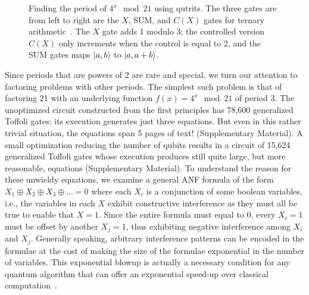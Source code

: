\documentclass{article}
\begin{document}
\begin{refsection}
\begin{wrapfigure}{r}{7cm}
  \centering
\caption{\label{fig:shor21}Finding the period of $4^x \mod{21}$ using
  qutrits. The three gates are from left to right are the $X$,
  $\textrm{SUM}$, and $C(X)$ gates for ternary
  arithmetic~\cite{10.5555/3179473.3179481}. The $X$ gate adds 1
  modulo 3; the controlled version $C(X)$ only increments when the
  control is equal to 2, and the \textrm{SUM} gates maps $\ket{a,b}$
  to $\ket{a,a+b}$.}
\end{wrapfigure}
Since periods that are powers of 2 are rare and special, we turn our
attention to factoring problems with other periods. The simplest such
problem is that of factoring 21 with an underlying function $f(x) =
4^x \mod{21}$ of period 3. The unoptimized circuit constructed from
the first principles has 78,600 generalized Toffoli gates; its
execution generates just three equations. But even in this rather
trivial situation, the equations span 5 pages of text!  (Supplementary
Material). A small optimization reducing the number of qubits results
in a circuit of 15,624 generalized Toffoli gates whose execution
produces still quite large, but more reasonable, equations
(Supplementary Material). To understand the reason for these unwieldy
equations, we examine a general ANF formula of the form $ X_1 \oplus
X_2 \oplus X_3 \oplus \ldots = 0$ where each $X_i$ is a conjunction of
some boolean variables, i.e., the variables in each $X$ exhibit
constructive interference as they must all be true to enable that
$X=1$. Since the entire formula must equal to 0, every $X_i = 1$ must
be offset by another $X_j = 1$, thus exhibiting negative interference
among $X_i$ and $X_j$. Generally speaking, arbitrary interference
patterns can be encoded in the formulae at the cost of making the size
of the formulae exponential in the number of variables. This
exponential blowup is actually a necessary condition for any quantum
algorithm that can offer an exponential speed-up over classical
computation~\cite{10.2307/3560059}.


\end{refsection}
\end{document}
